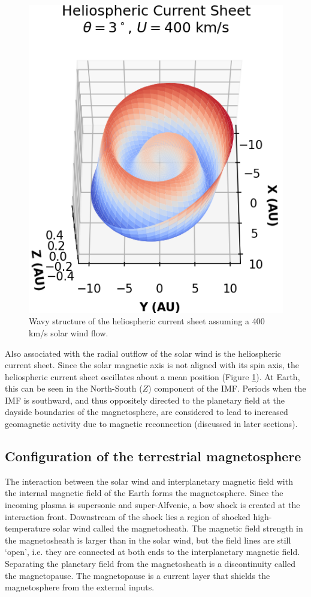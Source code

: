 \begin{figure}
    \centering
    \includegraphics{images1/heliospheric-currentsheet.png}
    \caption{Wavy structure of the heliospheric current sheet assuming a 400 km/s solar wind flow.}
    \label{fig:heliospheric-current-sheet}
\end{figure}


Also associated with the radial outflow of the solar wind is the heliospheric current sheet. Since the solar magnetic axis is not aligned with its spin axis, the heliospheric current sheet oscillates about a mean position (Figure \ref{fig:heliospheric-current-sheet}). At Earth, this can be seen in the North-South ($Z$) component of the IMF. Periods when the IMF is southward, and thus oppositely directed to the planetary field at the dayside boundaries of the magnetosphere, are considered to lead to increased geomagnetic activity due to magnetic reconnection (discussed in later sections). 

\subsection{Configuration of the terrestrial magnetosphere}
The interaction between the solar wind and interplanetary magnetic field with the internal magnetic field of the Earth forms the magnetosphere. Since the incoming plasma is supersonic and super-Alfvenic, a bow shock is created at the interaction front. Downstream of the shock lies a region of shocked high-temperature solar wind called the magnetosheath. The magnetic field strength in the magnetosheath is larger than in the solar wind, but the field lines are still `open', i.e. they are connected at both ends to the interplanetary magnetic field. Separating the planetary field from the magnetosheath is a discontinuity called the magnetopause. The magnetopause is a current layer that shields the magnetosphere from the external inputs.

